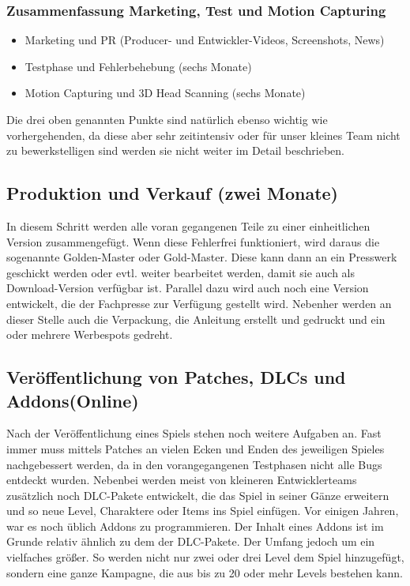 \subsubsection{Zusammenfassung Marketing, Test und Motion Capturing}
\begin{itemize}
\item Marketing und PR (Producer- und Entwickler-Videos, Screenshots, News)
\item Testphase und Fehlerbehebung (sechs Monate)
\item Motion Capturing und 3D Head Scanning (sechs Monate)
\end{itemize}

Die drei oben genannten Punkte sind natürlich ebenso wichtig wie vorhergehenden, da diese aber sehr zeitintensiv oder für unser kleines Team nicht zu bewerkstelligen sind werden sie nicht weiter im Detail beschrieben.

\subsection{Produktion und Verkauf (zwei Monate)}
In diesem Schritt werden alle voran gegangenen Teile zu einer einheitlichen Version zusammengefügt. Wenn diese Fehlerfrei funktioniert, wird daraus die sogenannte Golden-Master oder Gold-Master. Diese kann dann an ein Presswerk geschickt werden oder evtl. weiter bearbeitet werden, damit sie auch als Download-Version verfügbar ist.
Parallel dazu wird auch noch eine Version entwickelt, die der Fachpresse zur Verfügung gestellt wird. Nebenher werden an dieser Stelle auch die Verpackung, die Anleitung erstellt und gedruckt und ein oder mehrere Werbespots gedreht. 

\subsection{Veröffentlichung von Patches, DLCs und Addons(Online)}
Nach der Veröffentlichung eines Spiels stehen noch weitere Aufgaben an. Fast immer  muss mittels Patches an vielen Ecken und Enden des jeweiligen Spieles nachgebessert werden, da in den vorangegangenen Testphasen nicht alle Bugs entdeckt wurden. Nebenbei werden meist von kleineren Entwicklerteams zusätzlich noch DLC-Pakete entwickelt, die das Spiel in  seiner Gänze erweitern und so neue Level, Charaktere oder Items ins Spiel einfügen. Vor einigen Jahren, war es noch üblich Addons zu programmieren. Der Inhalt eines Addons ist im Grunde relativ ähnlich zu dem der DLC-Pakete. Der Umfang jedoch um ein vielfaches größer. So werden nicht nur zwei oder drei Level dem Spiel hinzugefügt, sondern eine ganze Kampagne, die aus bis zu 20 oder mehr Levels bestehen kann. 
\cite{Lorber:2011vl}

